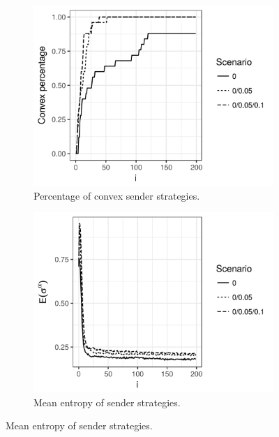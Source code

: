 \documentclass[a4paper]{article}
\begin{document}
\begin{figure}
  \centering
  \begin{subfigure}[]{0.32\textwidth}
    \includegraphics[width=\textwidth]{simulation/results/round-3/plots/convex-percentage-all-strong.png}
    \caption{Percentage of convex sender strategies.}
    \label{fig:convexity-tight-interaction}
  \end{subfigure}
  \hfill
  \begin{subfigure}[]{0.32\textwidth}
    \includegraphics[width=\textwidth]{simulation/results/round-3/plots/entropy-sender-all-strong.png}
    \caption{Mean entropy of sender strategies.}
    \label{fig:entropy-sender-tight-interaction}
  \end{subfigure}

\end{figure}
\end{document}
